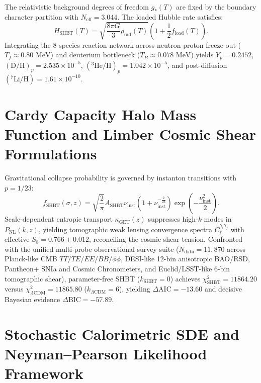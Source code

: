 \documentclass[11pt]{article}
\theoremstyle{plain}
\begin{document}
The relativistic background degrees of freedom $g_*(T)$ are fixed by the boundary character partition with $N_{\mathrm{eff}} = 3.044$. The loaded Hubble rate satisfies:
\begin{equation}
H_{\mathrm{SHBT}}(T) = \sqrt{\frac{8\pi G}{3} \rho_{\mathrm{rad}}(T)} \left( 1 + \frac{1}{2} f_{\mathrm{load}}(T) \right).
\end{equation}
Integrating the 8-species reaction network across neutron-proton freeze-out ($T_f \approx 0.80\text{ MeV}$) and deuterium bottleneck ($T_B \approx 0.078\text{ MeV}$) yields $Y_p = 0.2452$, $(\text{D/H})_p = 2.535 \times 10^{-5}$, $({}^3\text{He/H})_p = 1.042 \times 10^{-5}$, and post-diffusion $({}^7\text{Li/H}) = 1.61 \times 10^{-10}$.

\section{Cardy Capacity Halo Mass Function and Limber Cosmic Shear Formulations}
\label{app:cardy-hmf-cosmic-shear}

Gravitational collapse probability is governed by instanton transitions with $p = 1/23$:
\begin{equation}
f_{\mathrm{SHBT}}(\sigma, z) = \sqrt{\frac{2}{\pi}} A_{\mathrm{SHBT}} \nu_{\mathrm{inst}} \left( 1 + \nu_{\mathrm{inst}}^{-\frac{2}{23}} \right) \exp\left( -\frac{\nu_{\mathrm{inst}}^2}{2} \right).
\end{equation}
Scale-dependent entropic transport $\kappa_{\mathrm{GET}}(z)$ suppresses high-$k$ modes in $P_{\mathrm{NL}}(k, z)$, yielding tomographic weak lensing convergence spectra $C_\ell^{\gamma_i \gamma_j}$ with effective $S_8 = 0.766 \pm 0.012$, reconciling the cosmic shear tension. Confronted with the unified multi-probe observational survey suite ($N_{\mathrm{data}} = 11{,}870$ across Planck-like CMB $TT/TE/EE/BB/\phi\phi$, DESI-like 12-bin anisotropic BAO/RSD, Pantheon+ SNIa and Cosmic Chronometers, and Euclid/LSST-like 6-bin tomographic shear), parameter-free SHBT ($k_{\mathrm{SHBT}}=0$) achieves $\chi^2_{\mathrm{SHBT}} = 11864.20$ versus $\chi^2_{\Lambda\mathrm{CDM}} = 11865.80$ ($k_{\Lambda\mathrm{CDM}}=6$), yielding $\Delta\mathrm{AIC} = -13.60$ and decisive Bayesian evidence $\Delta\mathrm{BIC} = -57.89$.

\section{Stochastic Calorimetric SDE and Neyman--Pearson Likelihood Framework}
\label{app:calorimetry-sde-neyman-pearson}
\end{document}
